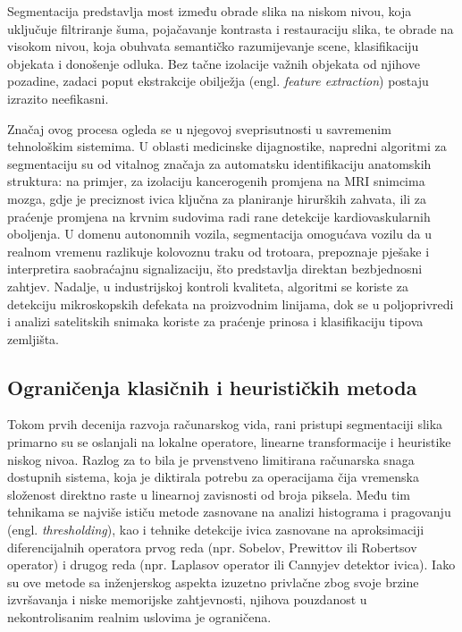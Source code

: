 \documentclass[11pt,a4paper]{article}
\begin{document}
Segmentacija predstavlja most između obrade slika na niskom nivou, koja uključuje filtriranje šuma, pojačavanje kontrasta i restauraciju slika, te obrade na visokom nivou, koja obuhvata semantičko razumijevanje scene, klasifikaciju objekata i donošenje odluka. Bez tačne izolacije važnih objekata od njihove pozadine, zadaci poput ekstrakcije obilježja (engl. \textit{feature extraction}) postaju izrazito neefikasni.

Značaj ovog procesa ogleda se u njegovoj sveprisutnosti u savremenim tehnološkim sistemima. U oblasti medicinske dijagnostike, napredni algoritmi za segmentaciju su od vitalnog značaja za automatsku identifikaciju anatomskih struktura: na primjer, za izolaciju kancerogenih promjena na MRI snimcima mozga, gdje je preciznost ivica ključna za planiranje hirurških zahvata, ili za praćenje promjena na krvnim sudovima radi rane detekcije kardiovaskularnih oboljenja. U domenu autonomnih vozila, segmentacija omogućava vozilu da u realnom vremenu razlikuje kolovoznu traku od trotoara, prepoznaje pješake i interpretira saobraćajnu signalizaciju, što predstavlja direktan bezbjednosni zahtjev. Nadalje, u industrijskoj kontroli kvaliteta, algoritmi se koriste za detekciju mikroskopskih defekata na proizvodnim linijama, dok se u poljoprivredi i analizi satelitskih snimaka koriste za praćenje prinosa i klasifikaciju tipova zemljišta.

\subsection{Ograničenja klasičnih i heurističkih metoda}
Tokom prvih decenija razvoja računarskog vida, rani pristupi segmentaciji slika primarno su se oslanjali na lokalne operatore, linearne transformacije i heuristike niskog nivoa. Razlog za to bila je prvenstveno limitirana računarska snaga dostupnih sistema, koja je diktirala potrebu za operacijama čija vremenska složenost direktno raste u linearnoj zavisnosti od broja piksela. Među tim tehnikama se najviše ističu metode zasnovane na analizi histograma i pragovanju (engl. \textit{thresholding}), kao i tehnike detekcije ivica zasnovane na aproksimaciji diferencijalnih operatora prvog reda (npr. Sobelov, Prewittov ili Robertsov operator) i drugog reda (npr. Laplasov operator ili Cannyjev detektor ivica). Iako su ove metode sa inženjerskog aspekta izuzetno privlačne zbog svoje brzine izvršavanja i niske memorijske zahtjevnosti, njihova pouzdanost u nekontrolisanim realnim uslovima je ograničena.
\end{document}
